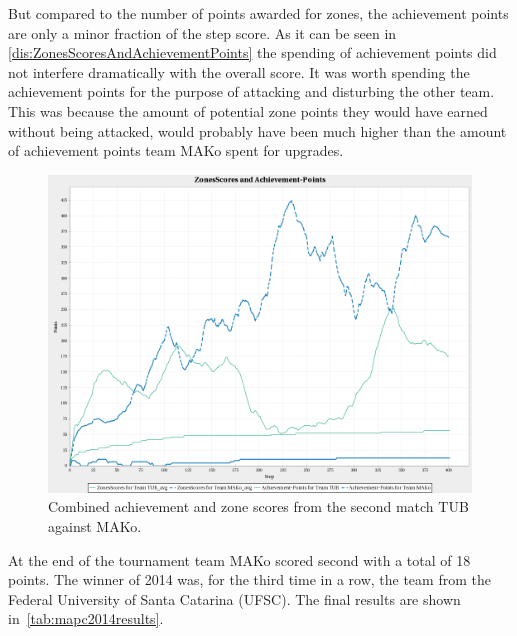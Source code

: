 But compared to the number of points awarded for zones, the achievement points are only a minor fraction of the step score.
As it can be seen in \autoref{dis:ZonesScoresAndAchievementPoints} the spending of achievement points did not interfere dramatically with the overall score.
It was worth spending the achievement points for the purpose of attacking and disturbing the other team.
This was because the amount of potential zone points they would have earned without being attacked, would probably have been much higher than the amount of achievement points team MAKo spent for upgrades.
\begin{figure}[h]
	\centering
	\includegraphics[width=\textwidth]{images/ZonesScoresAndAchievementPoints.png}
  \caption{Combined achievement and zone scores from the second match TUB against MAKo.}
	\label{dis:ZonesScoresAndAchievementPoints}
\end{figure}
At the end of the tournament team MAKo scored second with a total of 18 points.
The winner of 2014 was, for the third time in a row, the team from the Federal University of Santa Catarina (UFSC).
The final results are shown in~\autoref{tab:mapc2014results}.
